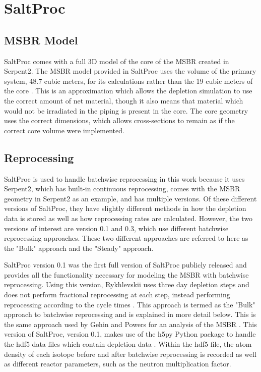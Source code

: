 \section{SaltProc}
\label{s:theSaltProc}

\subsection{MSBR Model}

SaltProc comes with a full 3D model of the core of the MSBR created in Serpent2.
The MSBR model provided in SaltProc uses the volume of the primary system, 48.7 cubic meters, for its calculations rather than the 19 cubic meters of the core \cite{rykhlevskii_modeling_2019}.
This is an approximation which allows the depletion simulation to use the correct amount of net material, though it also means that material which would not be irradiated in the piping is present in the core.
The core geometry uses the correct dimensions, which allows cross-sections to remain as if the correct core volume were implemented.

\subsection{Reprocessing}
\label{s:SP-repr}

SaltProc is used to handle batchwise reprocessing in this work because it uses Serpent2, which has built-in continuous reprocessing, comes with the MSBR geometry in Serpent2 as an example, and has multiple versions.
Of these different versions of SaltProc, they have slightly different methods in how the depletion data is stored as well as how reprocessing rates are calculated.
However, the two versions of interest are version 0.1 and 0.3, which use different batchwise reprocessing approaches.
These two different approaches are referred to here as the "Bulk" approach and the "Steady" approach.

SaltProc version 0.1 was the first full version of SaltProc publicly released and provides all the functionality necessary for modeling the MSBR with batchwise reprocessing.
Using this version, Rykhlevskii uses three day depletion steps and does not perform fractional reprocessing at each step, instead performing reprocessing according to the cycle times \cite{rykhlevskii_advanced_2018}.
This approach is termed as the "Bulk" approach to batchwise reprocessing and is explained in more detail below. This is the same approach used by Gehin and Powers for an analysis of the MSBR \cite{gehin_liquid_2016}.
This version of SaltProc, version 0.1, makes use of the h5py Python package to handle the hdf5 data files which contain depletion data \cite{collette_python_hdf5_2014}. Within the hdf5 file, the atom density of each isotope before and after batchwise reprocessing is recorded as well as different reactor parameters, such as the neutron multiplication factor.

